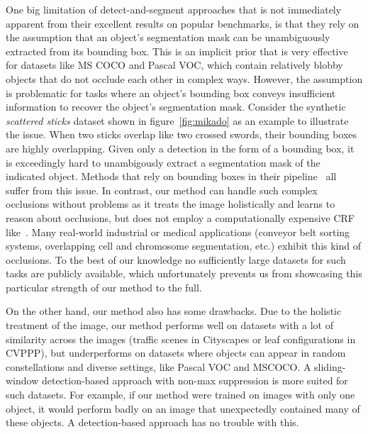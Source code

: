 \documentclass[10pt,twocolumn,letterpaper]{article}
\begin{document}
One big limitation of detect-and-segment approaches that is not immediately apparent from their excellent results on popular benchmarks, is that they rely on the assumption that an object's segmentation mask can be unambiguously extracted from its bounding box. 
This is an implicit prior that is very effective for datasets like MS COCO and Pascal VOC, which contain relatively blobby objects that do not occlude each other in complex ways. 
However, the assumption is problematic for tasks where an object's bounding box conveys insufficient information to recover the object's segmentation mask. 
Consider the synthetic \textit{scattered sticks} dataset shown in figure~\ref{fig:mikado} as an example to illustrate the issue. 
When two sticks overlap like two crossed swords, their bounding boxes are highly overlapping. Given only a detection in the form of a bounding box, it is exceedingly hard to unambigously extract a segmentation mask of the indicated object. 
Methods that rely on bounding boxes in their pipeline~\cite{hariharan2014simultaneous, pinheiro2015learning, pinheiro2016learning, dai2015convolutional, dai2015instance, xu2016gland, arnab2016bottom, park2015learning, ren2016end, liang2015proposal, arnab2017pixelwise, hayder2016shape} all suffer from this issue. In contrast, our method can handle such complex occlusions without problems as it treats the image holistically and learns to reason about occlusions, but does not employ a computationally expensive CRF like~\cite{arnab2017pixelwise}.
Many real-world industrial or medical applications (conveyor belt sorting systems, overlapping cell and chromosome segmentation, etc.) exhibit this kind of occlusions. To the best of our knowledge no sufficiently large datasets for such tasks are publicly available, which unfortunately prevents us from showcasing this particular strength of our method to the full.

On the other hand, our method also has some drawbacks. Due to the holistic treatment of the image, our method performs well on 
datasets with a lot of similarity across the images (traffic scenes in Cityscapes or leaf configurations in CVPPP), but
underperforms on datasets where objects can appear in random constellations and diverse settings, like Pascal VOC and MSCOCO. A sliding-window detection-based approach with non-max suppression is more suited for such datasets. For example, if our method were trained on images with only one object, it would perform badly on an image that unexpectedly contained many of these objects. A detection-based approach has no trouble with this.  
\end{document}
